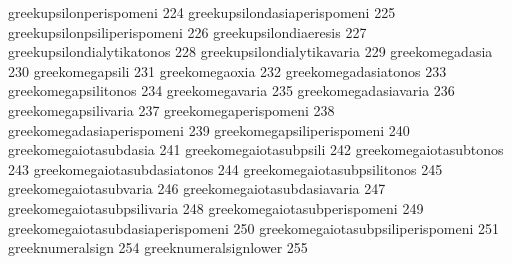  greekupsilonperispomeni           224
 greekupsilondasiaperispomeni      225
 greekupsilonpsiliperispomeni      226
 greekupsilondiaeresis             227
 greekupsilondialytikatonos        228
 greekupsilondialytikavaria        229
 greekomegadasia                   230
 greekomegapsili                   231
 greekomegaoxia                    232
 greekomegadasiatonos              233
 greekomegapsilitonos              234
 greekomegavaria                   235
 greekomegadasiavaria              236
 greekomegapsilivaria              237
 greekomegaperispomeni             238
 greekomegadasiaperispomeni        239
 greekomegapsiliperispomeni        240
 greekomegaiotasubdasia            241
 greekomegaiotasubpsili            242
 greekomegaiotasubtonos            243
 greekomegaiotasubdasiatonos       244
 greekomegaiotasubpsilitonos       245
 greekomegaiotasubvaria            246
 greekomegaiotasubdasiavaria       247
 greekomegaiotasubpsilivaria       248
 greekomegaiotasubperispomeni      249
 greekomegaiotasubdasiaperispomeni 250
 greekomegaiotasubpsiliperispomeni 251
 greeknumeralsign                  254
 greeknumeralsignlower             255

\stopencoding

\startencoding[default]

